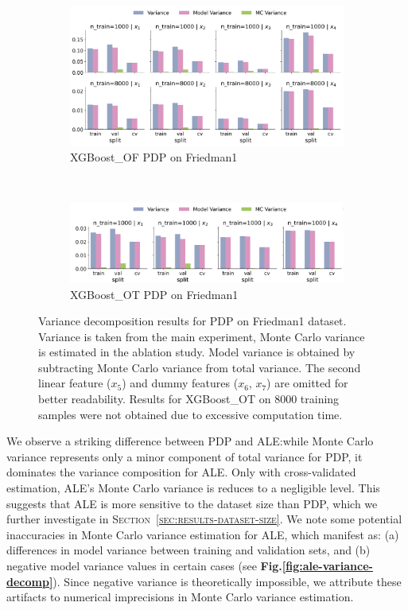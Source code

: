 \documentclass[runningheads]{llncs}
\begin{document}
\begin{figure}[htbp]
    \centering
    \begin{subfigure}[b]{0.75\textwidth}
        \includegraphics[width=\textwidth]{img/variance_decomposition_pdp_XGBoost_OF.png}
        \caption{XGBoost\_OF PDP on Friedman1}
    \end{subfigure}
    \\[10pt]
    \vfill
    \begin{subfigure}[b]{0.75\textwidth}
        \includegraphics[width=\textwidth]{img/variance_decomposition_pdp_XGBoost_OT.png}
        \caption{XGBoost\_OT PDP on Friedman1}
    \end{subfigure}
    \caption{Variance decomposition results for PDP on Friedman1 dataset. Variance is taken from the
        main experiment, Monte Carlo variance is estimated in the ablation study. Model variance is
        obtained by subtracting Monte Carlo variance from total variance. The second linear feature
        ($x_5$) and dummy features ($x_6$, $x_7$) are omitted for better readability. Results for XGBoost\_OT
        on 8000 training samples were not obtained due to excessive computation time.}
    \label{fig:pdp-variance-decomp}  %
\end{figure}

\noindent We observe a striking difference between PDP and ALE:\@ while Monte Carlo
variance represents only a minor component of total variance for PDP, it dominates
the variance composition for ALE. Only with cross-validated estimation,  %
ALE's Monte Carlo variance is reduces to a negligible level. This suggests that
ALE is more sensitive to the dataset size
than PDP, which we further investigate in
\textsc{Section~\ref{sec:results-dataset-size}}. We note some potential inaccuracies
in Monte Carlo variance estimation for ALE, which manifest as: (a) differences
in model variance between training and validation sets, and (b) negative model
variance values in certain cases (see
\textbf{Fig.\@\ref{fig:ale-variance-decomp}}). Since negative variance is theoretically
impossible, we attribute these artifacts to numerical imprecisions in Monte Carlo variance
estimation.
\end{document}
